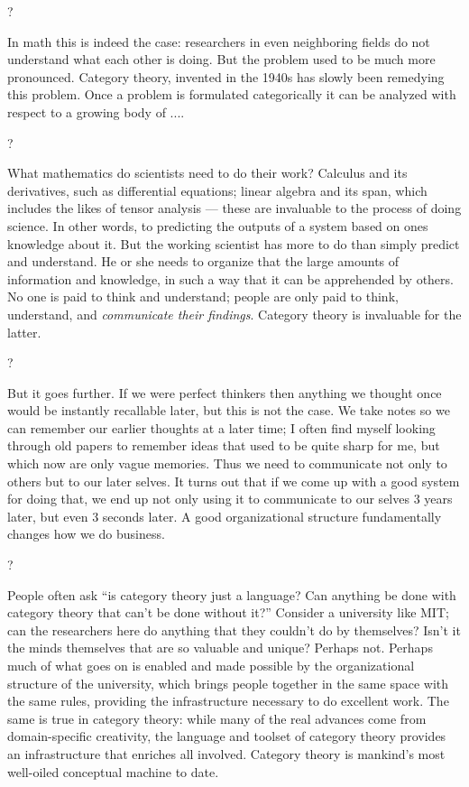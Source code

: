 \documentclass[a4paper]{book}
\theoremstyle{myth}
\begin{document}
\begin{russian}
? 

In math this is indeed the case: researchers in even neighboring fields do not understand what each other is doing. But the problem used to be much more pronounced. Category theory, invented in the 1940s has slowly been remedying this problem. Once a problem is formulated categorically it can be analyzed with respect to a growing body of ....

? 

What mathematics do scientists need to do their work? Calculus and its derivatives, such as differential equations; linear algebra and its span, which includes the likes of tensor analysis — these are invaluable to the process of doing science. In other words, to predicting the outputs of a system based on ones knowledge about it. But the working scientist has more to do than simply predict and understand. He or she needs to organize that the large amounts of information and knowledge, in such a way that it can be apprehended by others. No one is paid to think and understand; people are only paid to think, understand, and {\em communicate their findings}. Category theory is invaluable for the latter.

? 

But it goes further. If we were perfect thinkers then anything we thought once would be instantly recallable later, but this is not the case. We take notes so we can remember our earlier thoughts at a later time; I often find myself looking through old papers to remember ideas that used to be quite sharp for me, but which now are only vague memories. Thus we need to communicate not only to others but to our later selves. It turns out that if we come up with a good system for doing that, we end up not only using it to communicate to our selves 3 years later, but even 3 seconds later. A good organizational structure fundamentally changes how we do business.

? 

People often ask “is category theory just a language? Can anything be done with category theory that can't be done without it?” Consider a university like MIT; can the researchers here do anything that they couldn't do by themselves? Isn't it the minds themselves that are so valuable and unique? Perhaps not. Perhaps much of what goes on is enabled and made possible by the organizational structure of the university, which brings people together in the same space with the same rules, providing the  infrastructure necessary to do excellent work. The same is true in category theory: while many of the real advances come from domain-specific creativity, the language and toolset of category theory provides an infrastructure that enriches all involved. Category theory is mankind's most well-oiled conceptual machine to date.


\end{russian}
\end{document}
